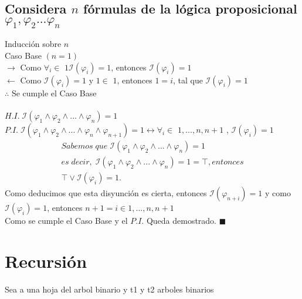 \documentclass[11pt,letterpaper]{article}
\renewcommand\qedsymbol{$\blacksquare$}
\begin{document}
         \subsection{Considera $n$ fórmulas de la lógica proposicional $\varphi_{1},\varphi_{2}...\varphi_{n}$}
            Inducción sobre $n$ \\
            \hspace{1cm} Caso Base $(n = 1)$ \\
            $\rightarrow$ Como $\forall_{i} \in $ \textbraceleft $ 1 $\textbraceright$ \mathcal{I}(\varphi_{i}) = 1$, entonces $\mathcal{I}(\varphi_{i}) = 1$ \\
            $\leftarrow$ Como $ \mathcal{I}(\varphi_{i}) = 1$ y $1 \in $  \textbraceleft $ 1 $\textbraceright, entonces $1 = i$, tal que $\mathcal{I}(\varphi_{i}) = 1$ \\
            $\therefore$ Se cumple el Caso Base \\ \\
            $H.I. \; \mathcal{I} (\varphi_{1} \wedge \varphi_{2}\wedge...\wedge \varphi_{n}) = 1$\\
            $P.I. \; \mathcal{I} (\varphi_{1} \wedge \varphi_{2}\wedge...\wedge \varphi_{n}\wedge \varphi_{n+1}) = 1 \leftrightarrow \forall_{i} \in$ \textbraceleft $1,...,n,n+1$ \textbraceright, $ \mathcal{I}(\varphi_{i}) = 1$ \\
            \begin{align}\tag{Por $H.I.$}
               Sabemos \; que \; \mathcal{I} (\varphi_{1} \wedge \varphi_{2}\wedge...\wedge \varphi_{n}) = 1 \\
               es \; decir, \; \mathcal{I} (\varphi_{1} \wedge \varphi_{2}\wedge...\wedge \varphi_{n}) = 1 = \top, entonces \\
               \top \vee \mathcal{I}(\varphi_{i}) = 1.
            \end{align}
            Como deducimos que esta disyunción es cierta, entonces $ \mathcal{I}(\varphi_{n+i}) = 1$ y como $ \mathcal{I}(\varphi_{i}) = 1$, entonces $n+1 = i \in $\textbraceleft $ 1,...,n,n+1 $\textbraceright \\
            Como se cumple el Caso Base y el $P.I.$ Queda demostrado.  \qedsymbol
   \section{Recursión}
   Sea a una hoja del arbol binario y t1 y t2 arboles binarios
\end{document}
